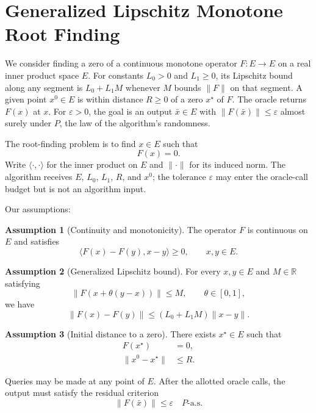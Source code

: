 \documentclass[10pt]{article}
\theoremstyle{definition}
\newtheorem{assumption}{Assumption}
\begin{document}
\section*{Generalized Lipschitz Monotone Root Finding}
We consider finding a zero of a continuous monotone operator $F:E\to E$ on a real inner product space $E$. For constants $L_0>0$ and $L_1\geq 0$, its Lipschitz bound along any segment is $L_0+L_1M$ whenever $M$ bounds $\|F\|$ on that segment. A given point $x^0\in E$ is within distance $R\geq 0$ of a zero $x^\star$ of $F$. The oracle returns $F(x)$ at $x$. For $\varepsilon>0$, the goal is an output $\bar{x}\in E$ with $\|F(\bar{x})\|\leq\varepsilon$ almost surely under $P$, the law of the algorithm's randomness.

The root-finding problem is to find $x\in E$ such that
\[
F(x)=0.
\]
Write $\langle\cdot,\cdot\rangle$ for the inner product on $E$ and $\|\cdot\|$ for its induced norm. The algorithm receives $E$, $L_0$, $L_1$, $R$, and $x^0$; the tolerance $\varepsilon$ may enter the oracle-call budget but is not an algorithm input.

Our assumptions:
\begin{assumption}[Continuity and monotonicity]
The operator $F$ is continuous on $E$ and satisfies
\[
\langle F(x)-F(y),x-y\rangle\geq 0,
\qquad x,y\in E.
\]
\end{assumption}

\begin{assumption}[Generalized Lipschitz bound]
For every $x,y\in E$ and $M\in\mathbb{R}$ satisfying
\[
\|F(x+\theta(y-x))\|\leq M,
\qquad \theta\in[0,1],
\]
we have
\[
\|F(x)-F(y)\|\leq (L_0+L_1M)\|x-y\|.
\]
\end{assumption}

\begin{assumption}[Initial distance to a zero]
There exists $x^\star\in E$ such that
\[
\begin{aligned}
F(x^\star)&=0,\\
\|x^0-x^\star\|&\leq R.
\end{aligned}
\]
\end{assumption}

Queries may be made at any point of $E$. After the allotted oracle calls, the output must satisfy the residual criterion
\[
\|F(\bar{x})\|\leq\varepsilon
\quad P\text{-a.s.}
\]
\end{document}
